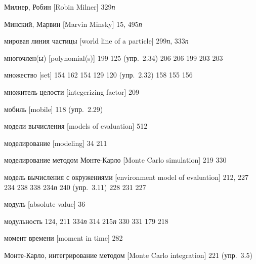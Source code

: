 \begin{theindex}
\item {Милнер, Робин [Robin Milner]} 329{\it п}
\item {Минский, Марвин [Marvin Minsky]} 15, 495{\it п}
\item {мировая линия частицы [world line of a particle]} 299{\it п}, 333{\it п}
\item {многочлен(ы) [polynomial(s)]} 199
   125 (упр.~2.34)
   206
   206
   199
   203
   203
\item {множество [set]} 154
   162
   154
   129
   120 (упр.~2.32)
   158
   155
   156
\item {множитель целости [integerizing factor]} 209
\item {мобиль [mobile]} 118 (упр.~2.29)
\item {модели вычисления [models of evaluation]} 512
\item {моделирование [modeling]}
   34
   211
\item {моделирование методом Монте-Карло [Monte Carlo simulation]} 219
   330
\item {модель вычисления с окружениями [environment model of evaluation]} 212, 227
   234
   238
   338
   234{\it п}
   240 (упр.~3.11)
   228
   231
   227
\item {модуль [absolute value]} 36
\item {модульность} 124, 211
   334{\it п}
   314
   215{\it п}
   330
   331
   179
   218
\item {момент времени [moment in time]} 282
\item {Монте-Карло, интегрирование методом [Monte Carlo integration]} 221 (упр.~3.5)

\end{theindex}
